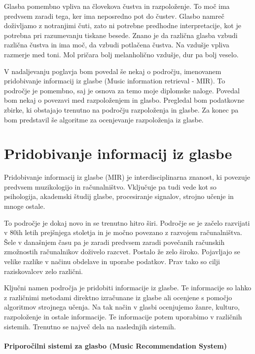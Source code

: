 \documentclass[a4paper, 12pt]{book}
\begin{document}
{Glasba pomembno vpliva na človekova čustva in razpoloženje. To moč ima predvsem zaradi tega, ker ima neposredno pot do čustev. Glasbo namreč do\-živ\-lja\-mo z notranjimi čuti, zato ni potrebne predhodne interpretacije, kot je potrebna pri razumevanju tiskane besede.  Znano je da različna glasba vzbudi različna čustva in ima moč, da vzbudi potlačena čustva. Na vzdušje vpliva razmerje med toni. Mol pričara bolj melanholično vzdušje, dur pa bolj veselo. \cite{lenko2009pomen}

V nadaljevanju poglavja bom povedal še nekaj o področju, imenovanem pridobivanje informacij iz glasbe (Music information retrieval - MIR). To področje je pomembno, saj je osnova za temo moje diplomske naloge. Povedal bom nekaj o povezavi med razpoloženjem in glasbo. Pregledal bom podatkovne zbirke, ki obstajajo trenutno na področju razpoloženja in glasbe. Za konec pa bom predstavil še algoritme za ocenjevanje razpoloženja iz glasbe. 

\section{Pridobivanje informacij iz glasbe}

Pridobivanje informacij iz glasbe (MIR) je interdisciplinarna znanost, ki povezuje predvsem muzikologijo in računalništvo. \cite{pesek2012prepoznavanje} Vključuje pa tudi vede kot so psihologija, akademski študij glasbe, procesiranje signalov, strojno učenje in mnoge ostale. 

To področje je dokaj novo in se trenutno hitro širi. Področje se je začelo razvijati v 80ih letih prejšnjega stoletja in je močno povezano z razvojem računalništva. Šele v današnjem času pa je zaradi predvsem zaradi povečanih računskih zmožnostih računalnikov doživelo razcvet. Postalo že zelo široko. Pojavljajo se velike razlike v načinu obdelave in uporabe podatkov. Prav tako so cilji raziskovalcev zelo različni.

Ključni namen področja je pridobiti informacije iz glasbe. Te informacije so lahko z različnimi metodami direktno izračunane iz glasbe ali ocenjene s pomočjo algoritmov strojnega učenja. Na tak način v glasbi ocenjujemo žanre, kulturo, razpoloženje in ostale informacije. Te informacije potem uporabimo v različnih sistemih. Trenutno se največ dela na naslednjih sistemih. 

\paragraph{Priporočilni sistemi za glasbo (Music Recommendation System)}

}
\end{document}
